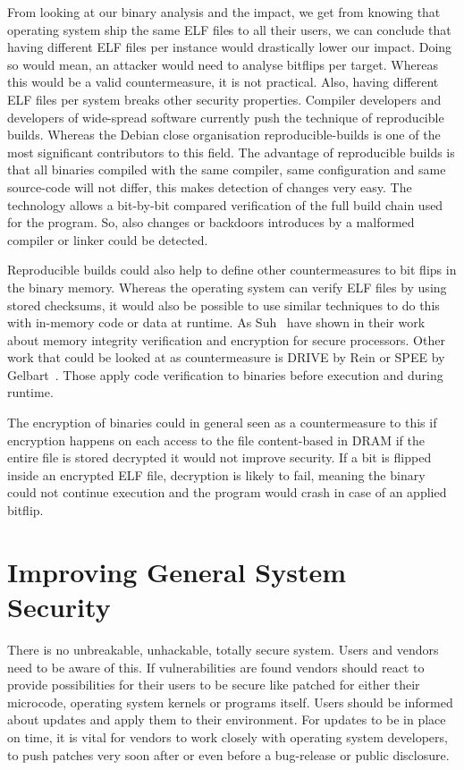 From looking at our binary analysis and the impact, we get from knowing that
operating system ship the same ELF files to all their users, we can conclude
that having different ELF files per instance would drastically lower our impact.
Doing so would mean, an attacker would need to analyse bitflips per target.
Whereas this would be a valid countermeasure, it is not practical. Also, having
different ELF files per system breaks other security properties. Compiler
developers and developers of wide-spread software currently push the technique
of reproducible builds. Whereas the Debian close organisation
reproducible-builds\cite{reprobuilds} is one of the most significant
contributors to this field. The advantage of reproducible builds is that all
binaries compiled with the same compiler, same configuration and same
source-code will not differ, this makes detection of changes very easy. The
technology allows a bit-by-bit compared verification of the full build chain
used for the program. So, also changes or backdoors introduces by a malformed
compiler or linker could be detected.

Reproducible builds could also help to define other countermeasures to bit flips
in the binary memory. Whereas the operating system can verify ELF files by using
stored checksums, it would also be possible to use similar techniques to do this
with in-memory code or data at runtime. As Suh~\etal\cite{memintegrity} have
shown in their work about memory integrity verification and encryption for
secure processors. Other work that could be looked at as countermeasure is
DRIVE\cite{drive} by Rein or SPEE\cite{spee} by Gelbart~\etal. Those apply
code verification to binaries before execution and during runtime.

The encryption of binaries could in general seen as a countermeasure to this if
encryption happens on each access to the file content-based in DRAM if the
entire file is stored decrypted it would not improve security. If a bit is
flipped inside an encrypted ELF file, decryption is likely to fail, meaning the
binary could not continue execution and the program would crash in case of an
applied bitflip.

\section{Improving General System Security}

There is no unbreakable, unhackable, totally secure system. Users and vendors
need to be aware of this. If vulnerabilities are found vendors should react to
provide possibilities for their users to be secure like patched for either their
microcode, operating system kernels or programs itself. Users should be informed
about updates and apply them to their environment. For updates to be in place on
time, it is vital for vendors to work closely with operating system developers,
to push patches very soon after or even before a bug-release or public
disclosure.

